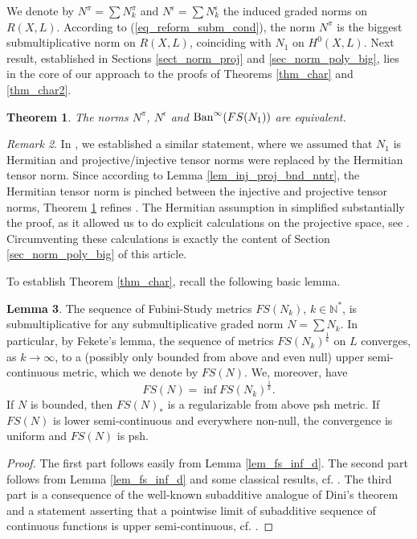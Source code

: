 \documentclass[12pt]{article}
\numberwithin{equation}{section}
\theoremstyle{theorem}
\newtheorem{thm}{Theorem}[section]
\theoremstyle{definition}
\newtheorem{lem}[thm]{Lemma}
\theoremstyle{remark}
\newtheorem{rem}[thm]{Remark}
\newcommand{\nat}{\mathbb{N}}
\begin{document}
 	We denote by $N^{\pi} = \sum N_k^{\pi}$ and $N^{\epsilon} = \sum N_k^{\epsilon}$ the induced graded norms on $R(X, L)$.
 	According to (\ref{eq_reform_subm_cond}), the norm $N^{\pi}$ is the biggest submultiplicative norm on $R(X, L)$, coinciding with $N_1$ on $H^0(X, L)$.
 	Next result, established in Sections \ref{sect_norm_proj} and \ref{sec_norm_poly_big}, lies in the core of our approach to the proofs of Theorems \ref{thm_char} and \ref{thm_char2}.
 	\begin{thm}\label{thm_induc}
 		The norms $N^{\pi}$, $N^{\epsilon}$ and ${\rm{Ban}}^{\infty}(FS(N_1))$ are equivalent.
 	\end{thm} 
 	\begin{rem}
 		In \cite[Theorem 4.18]{FinSecRing}, we established a similar statement, where we assumed that $N_1$ is Hermitian and projective/injective tensor norms were replaced by the Hermitian tensor norm.
 		Since according to Lemma \ref{lem_inj_proj_bnd_nntr}, the Hermitian tensor norm is pinched between the injective and projective tensor norms, Theorem \ref{thm_induc} refines \cite[Theorem 4.18]{FinSecRing}.
 		The Hermitian assumption in \cite{FinSecRing} simplified substantially the proof, as it allowed us to do explicit calculations on the projective space, see \cite[the first part of the proof of Theorem 4.18]{FinSecRing}.
 		Circumventing these calculations is exactly the content of Section \ref{sec_norm_poly_big} of this article.
 	\end{rem}
 	To establish Theorem \ref{thm_char}, recall the following basic lemma.
		\begin{lem}\label{lem_fs_dini}
			The sequence of Fubini-Study metrics $FS(N_k)$, $k \in \nat^*$, is submultiplicative for any submultiplicative graded norm $N = \sum N_k$.
			In particular, by Fekete's lemma, the sequence of metrics $FS(N_k)^{\frac{1}{k}}$ on $L$ converges, as $k \to \infty$, to a (possibly only bounded from above and even null) upper semi-continuous metric, which we denote by $FS(N)$.
			We, moreover, have 
			\begin{equation}\label{eq_fek_inf}
				FS(N) = \inf FS(N_k)^{\frac{1}{k}}.
			\end{equation}
			If $N$ is bounded, then $FS(N)_*$ is a regularizable from above psh metric.
			If $FS(N)$ is lower semi-continuous and everywhere non-null, the convergence is uniform and $FS(N)$ is psh.
		\end{lem}
		\begin{proof}
			The first part follows easily from Lemma \ref{lem_fs_inf_d}.
			The second part follows from Lemma \ref{lem_fs_inf_d} and some classical results, cf. \cite[Proposition I.4.24]{DemCompl}.
			The third part is a consequence of the well-known subadditive analogue of Dini's theorem and a statement asserting that a pointwise limit of subadditive sequence of continuous functions is upper semi-continuous, cf. \cite[Appendix A]{FinSecRing}.
		\end{proof}
\end{document}

